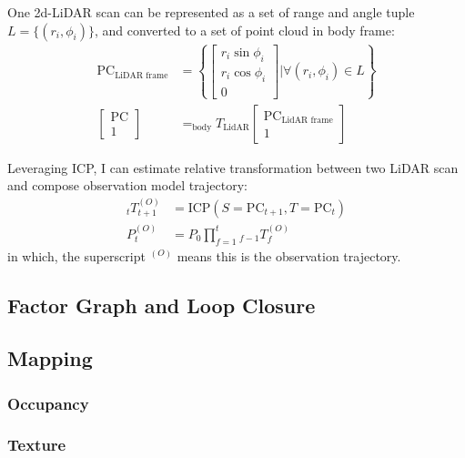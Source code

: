 \documentclass[conference]{IEEEtran}
\begin{document}
One 2d-LiDAR scan can be represented as a set of range and angle tuple $L = \{(r_i, \phi_i)\}$,
and converted to a set of point cloud in body frame:
$$
\begin{aligned}
    \mathrm{PC}_{\text{LiDAR frame}} 
        &= \left\{ \left[ \begin{gathered}r_i\sin \phi_i \\ r_i\cos \phi_i \\ 0\end{gathered} \right] | \forall (r_i, \phi_i)\in L\right\} 
        \\
    \left[ \begin{gathered} \mathrm{PC} \\ 1\end{gathered} \right]  
    &= _{\text{body}}T_{\text{LidAR}}  \left[ \begin{gathered} \mathrm{PC}_{\text{LidAR frame}}  \\ 1\end{gathered} \right]  
\end{aligned}
$$

Leveraging ICP, I can estimate relative transformation between two LiDAR scan and
compose observation model trajectory:
$$
\begin{aligned}
    _{t}T^{(O)}_{t+1}
        &=\text{ICP}(S=\mathrm{PC}_{t+1}, T=\mathrm{PC}_{t}) \\ 
    P^{(O)}_{t}
        &=P_{0}\prod^{t}_{f=1} {}_{f-1} T^{(O)}_{f}
\end{aligned} 
$$
in which, the superscript $^{(O)}$ means this is the observation trajectory.

\subsection{Factor Graph and Loop Closure}

\subsection{Mapping}

\subsubsection{Occupancy}


\subsubsection{Texture}
\end{document}
